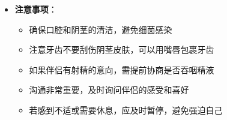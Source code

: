 \documentclass[12pt,UTF8]{ctexbook}
\begin{document}
\begin{itemize}
\begin{itemize}
\begin{itemize}
      \item 唾液控制：根据需要调整唾液量，保持适当的湿润度
      \end{itemize}
    \end{itemize}
  \item \textbf{注意事项}：
    \begin{itemize}
    \item 确保口腔和阴茎的清洁，避免细菌感染
    \item 注意牙齿不要刮伤阴茎皮肤，可以用嘴唇包裹牙齿
    \item 如果伴侣有射精的意向，需提前协商是否吞咽精液
    \item 沟通非常重要，及时询问伴侣的感受和喜好
    \item 若感到不适或需要休息，应及时暂停，避免强迫自己
    \end{itemize}
  \end{itemize}
\end{document}
